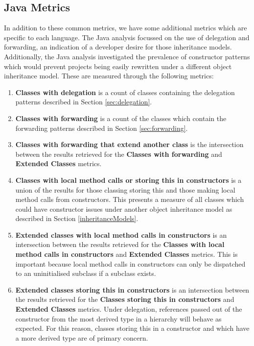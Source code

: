 \subsection{Java Metrics}
In addition to these common metrics, we have some additional metrics which are specific to each language. The Java analysis focussed on the use of delegation and forwarding, an indication of a developer desire for those inheritance models. Additionally, the Java analysis investigated the prevalence of constructor patterns which would prevent projects being easily rewritten under a different object inheritance model. These are measured through the following metrics:
\begin{enumerate}
	\item \textbf{Classes with delegation} is a count of classes containing the delegation patterns described in Section \ref{sec:delegation}.
	
	\item \textbf{Classes with forwarding} is a count of the classes which contain the forwarding patterns described in Section \ref{sec:forwarding}.
	
	\item \textbf{Classes with forwarding that extend another class} is the intersection between the results retrieved for the \textbf{Classes with forwarding} and \textbf{Extended Classes} metrics.
	
	\item \textbf{Classes with local method calls or storing this in constructors} is a union of the results for those classing storing this and those making local method calls from constructors. This presents a measure of all classes which could have constructor issues under another object inheritance model as described in Section \ref{inheritanceModels}.
	
	\item \textbf{Extended classes with local method calls in constructors} is an intersection between the results retrieved for the \textbf{Classes with local method calls in constructors} and \textbf{Extended Classes} metrics. This is important because local method calls in constructors can only be dispatched to an uninitialised subclass if a subclass exists.
	
	\item \textbf{Extended classes storing this in constructors} is an intersection between the results retrieved for the \textbf{Classes storing this in constructors} and \textbf{Extended Classes} metrics. Under delegation, references passed out of the constructor from the most derived type in a hierarchy will behave as expected. For this reason, classes storing this in a constructor and which have a more derived type are of primary concern.
\end{enumerate}


